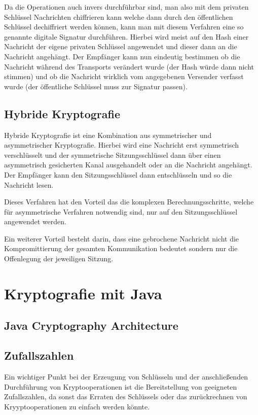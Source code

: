 \documentclass[11pt,a4paper]{scrreprt}
\begin{document}
Da die Operationen auch invers durchführbar sind, man also mit dem privaten Schlüssel Nachrichten chiffrieren kann welche dann durch den öffentlichen Schlüssel dechiffriert werden können, kann man mit diesem Verfahren eine so genannte digitale Signatur durchführen. Hierbei wird meist auf den Hash einer Nachricht der eigene privaten Schlüssel angewendet und dieser dann an die Nachricht angehängt. Der Empfänger kann nun eindeutig bestimmen ob die Nachricht während des Transports verändert wurde (der Hash würde dann nicht stimmen) und ob die Nachricht wirklich vom angegebenen Versender verfasst wurde (der öffentliche Schlüssel muss zur Signatur passen).

\section{Hybride Kryptografie}
Hybride Kryptografie ist eine Kombination aus symmetrischer und asymmetrischer Kryptografie. Hierbei wird eine Nachricht erst symmetrisch verschlüsselt und der symmetrische Sitzungsschlüssel dann über einen asymmetrisch gesicherten Kanal ausgehandelt oder an die Nachricht angehängt. Der Empfänger kann den Sitzungsschlüssel dann entschlüsseln und so die Nachricht lesen.

Dieses Verfahren hat den Vorteil das die komplexen Berechnungsschritte, welche für asymmetrische Verfahren notwendig sind, nur auf den Sitzungsschlüssel angewendet werden. 

Ein weiterer Vorteil besteht darin, dass  eine gebrochene Nachricht nicht die Kompromittierung der gesamten Kommunikation bedeutet sondern nur die Offenlegung der jeweiligen Sitzung.


\chapter{Kryptografie mit Java}
\section{Java Cryptography Architecture}

\section{Zufallszahlen}
Ein wichtiger Punkt bei der Erzeugung von Schlüsseln und der anschließenden Durchführung von Kryptooperationen ist die Bereitstellung von geeigneten Zufallszahlen, da sonst das Erraten des Schlüssels oder das zurückrechnen von Kryyptooperationen zu einfach werden könnte.
\end{document}
